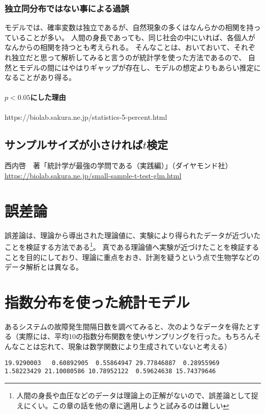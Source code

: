 \documentclass[a4paper,11pt,dvipdfmx]{jsarticle}
\begin{document}
\subsubsection{独立同分布ではない事による過誤}
モデルでは、確率変数は独立であるが、自然現象の多くはなんらかの相関を持っていることが多い。
人間の身長であっても、同じ社会の中にいれば、各個人がなんからの相関を持つとも考えられる。
そんなことは、おいておいて、それぞれ独立だと思って解析してみると言うのが統計学を使った方法であるので、
自然とモデルの間にはやはりギャップが存在し、モデルの想定よりもあらい推定になることがあり得る。

\paragraph{$p<0.05$にした理由}
https://biolab.sakura.ne.jp/statistics-5-percent.html
\fi



\subsection{サンプルサイズが小さければ$t$検定}
西内啓　著「統計学が最強の学問である（実践編）」（ダイヤモンド社）
\url{https://biolab.sakura.ne.jp/small-sample-t-test-glm.html}
\fi 


\section{誤差論}
誤差論は、理論から導出された理論値に、実験により得られたデータが近づいたことを検証する方法である\footnote{人間の身長や血圧などのデータは理論上の正解がないので、誤差論として捉えにくい。この章の話を他の章に適用しようと試みるのは難しい}。
真である理論値へ実験が近づけたことを検証することを目的にしており、理論に重点をおき、計測を疑うという点で生物学などのデータ解析とは異なる。





\section{指数分布を使った統計モデル}
あるシステムの故障発生間隔日数を調べてみると、次のようなデータを得たとする（実際には、平均10の指数分布関数を使いサンプリングを行った。もちろんそんなことは忘れて、現象は数学関数により生成されていないと考える）
\begin{lstlisting}
19.9290003   0.60892905  0.55864947 29.77846887  0.28955969  1.58223429 21.10080586 10.78952122  0.59624638 15.74379646
\end{lstlisting}
\end{document}
